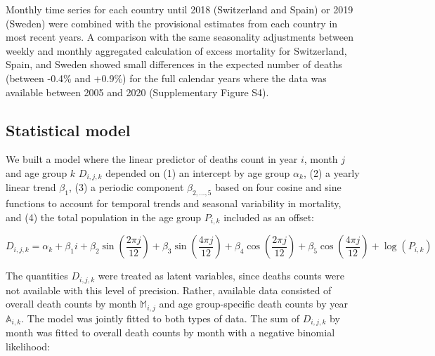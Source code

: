 \documentclass{article}
\begin{document}
	Monthly time series for each country until 2018 (Switzerland and Spain) or 2019 (Sweden) were combined with the provisional estimates from each country in most recent years. A comparison with the same seasonality adjustments between weekly and monthly aggregated calculation of excess mortality for Switzerland, Spain, and Sweden showed small differences in the expected number of deaths (between -0.4\% and +0.9\%) for the full calendar years where the data was available between 2005 and 2020 (Supplementary Figure S4).
	
	\subsection{Statistical model}
	
	We built a model where the linear predictor of deaths count in year $i$, month $j$ and age group $k$ $D_{i,j,k}$ depended on (1) an intercept by age group $\alpha_k$, (2) a yearly linear trend $\beta_1$, (3) a periodic component $\beta_{2,\ldots,5}$ based on four cosine and sine functions to account for temporal trends and seasonal variability in mortality, and (4) the total population in the age group $P_{i,k}$ included as an offset: 
	
	\begin{equation}
		D_{i,j,k} = \alpha_k + 
		\beta_1 i + 
		\beta_2 \sin\left(\frac{2\pi j}{12}\right) + 
		\beta_3 \sin\left(\frac{4\pi j}{12}\right) + 
		\beta_4 \cos\left(\frac{2\pi j}{12}\right) + 
		\beta_5 \cos\left(\frac{4\pi j}{12}\right) + 
		\log(P_{i,k})
	\end{equation}
	
	
	The quantities $D_{i,j,k}$ were treated as latent variables, since deaths counts were not available with this level of precision. Rather, available data consisted of overall death counts by month $\mathds{M}_{i,j}$ and age group-specific death counts by year $\mathds{A}_{i,k}$. The model was jointly fitted to both types of data.  The sum of $D_{i,j,k}$ by month was fitted to overall death counts by month with a negative binomial likelihood:
	
\end{document}
